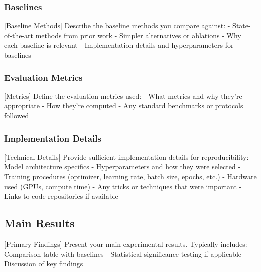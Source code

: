 \subsubsection{Baselines}
\label{sec:baselines}

[Baseline Methods] Describe the baseline methods you compare against:
- State-of-the-art methods from prior work
- Simpler alternatives or ablations
- Why each baseline is relevant
- Implementation details and hyperparameters for baselines

\subsubsection{Evaluation Metrics}
\label{sec:metrics}

[Metrics] Define the evaluation metrics used:
- What metrics and why they're appropriate
- How they're computed
- Any standard benchmarks or protocols followed

\subsubsection{Implementation Details}
\label{sec:implementation}

[Technical Details] Provide sufficient implementation details for reproducibility:
- Model architecture specifics
- Hyperparameters and how they were selected
- Training procedures (optimizer, learning rate, batch size, epochs, etc.)
- Hardware used (GPUs, compute time)
- Any tricks or techniques that were important
- Links to code repositories if available

\subsection{Main Results}
\label{sec:main-results}

[Primary Findings] Present your main experimental results. Typically includes:
- Comparison table with baselines
- Statistical significance testing if applicable
- Discussion of key findings


